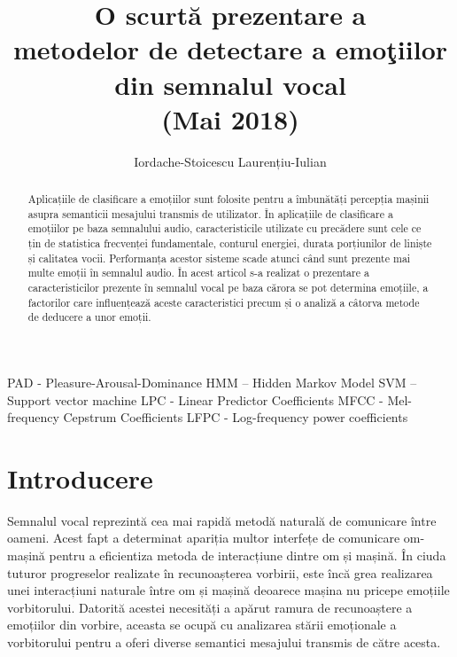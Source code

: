 \documentclass[9pt,shortpaper,twoside,web]{ieeecolor}
\begin{document}
\title{
O scurtă prezentare a \\
metodelor de detectare a emoţiilor din semnalul vocal  \\ 
(Mai 2018)}
\author{Iordache-Stoicescu Laurențiu-Iulian}

\maketitle


\begin{abstract}
Aplicațiile de clasificare a emoțiilor sunt folosite pentru a îmbunătăți percepția mașinii asupra semanticii mesajului transmis de utilizator. În aplicațiile de clasificare a emoțiilor pe baza semnalului audio, caracteristicile utilizate cu precădere sunt cele ce țin de statistica frecvenței fundamentale, conturul energiei, durata porțiunilor de liniște și calitatea vocii. Performanța acestor sisteme scade atunci când sunt prezente mai multe emoții în semnalul audio. În acest articol s-a realizat o prezentare a caracteristicilor prezente în semnalul vocal pe baza cărora se pot determina emoțiile, a factorilor care influențează aceste caracteristici precum și o analiză a câtorva metode de deducere a unor emoții. 
\end{abstract}

\begin{IEEEkeywords}
PAD - Pleasure-Arousal-Dominance
HMM – Hidden Markov Model
SVM – Support vector machine
LPC - Linear Predictor Coefficients
MFCC - Mel-frequency Cepstrum Coefficients
LFPC -  Log-frequency power coefficients
\end{IEEEkeywords}


\section{Introducere}
\label{sec:introduction}
Semnalul vocal reprezintă cea mai rapidă metodă naturală de comunicare între oameni. Acest fapt a determinat apariția multor interfețe de comunicare om-mașină pentru a eficientiza metoda de interacțiune dintre om și mașină. În ciuda tuturor progreselor realizate în recunoașterea vorbirii, este încă grea realizarea unei interacțiuni naturale între om și mașină deoarece mașina nu pricepe emoțiile vorbitorului. Datorită acestei necesități a apărut ramura de recunoaștere a emoțiilor din vorbire, aceasta se ocupă cu analizarea stării emoționale a vorbitorului pentru a oferi diverse semantici mesajului transmis de către acesta.
\end{document}
